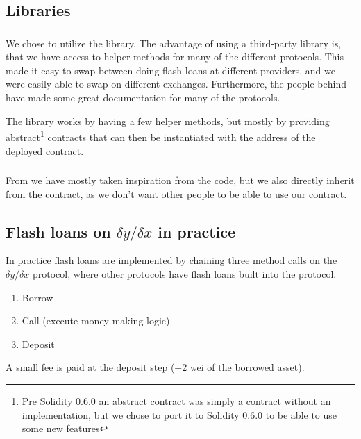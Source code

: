 \subsection{Libraries}
\subsubsection{}
We chose to utilize the  library. The advantage of using a
third-party library is, that we have access to helper methods for many of the
different protocols. This made it easy to swap between doing flash loans at
different providers, and we were easily able to swap on different exchanges.
Furthermore, the people behind  have made some great
documentation for many of the protocols.

The  library works by having a few helper methods, but mostly
by providing abstract\footnote{Pre Solidity 0.6.0 an abstract contract was
simply a contract without an implementation, but we chose to port it to Solidity
0.6.0 to be able to use some new features} contracts that can then be
instantiated with the address of the deployed contract.

\subsubsection{}

From  we have mostly taken inspiration from the code, but we
also directly inherit from the  contract, as we don't want other
people to be able to use our contract.

\subsection{Flash loans on $\delta y/\delta x$ in practice}
In practice flash loans are implemented by chaining three method calls on the
$\delta y/\delta x$ protocol, where other protocols have flash loans built
into the protocol.
\begin{enumerate}
    \item Borrow
    \item Call (execute money-making logic)
    \item Deposit
\end{enumerate}
A small fee is paid at the deposit step (+2 wei of the borrowed asset).

